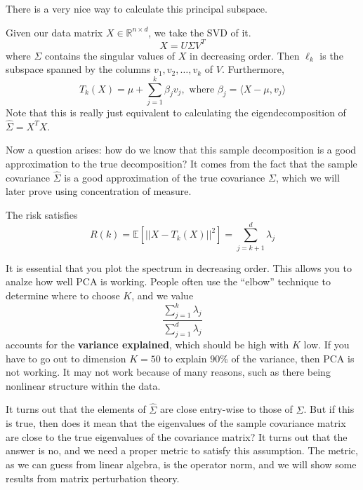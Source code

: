     There is a very nice way to calculate this principal subspace. 

    \begin{theorem} 
      Given our data matrix $X \in \mathbb{R}^{n \times d}$, we take the SVD of it. 
      \begin{equation}
        X = U \Sigma V^T
      \end{equation}
      where $\Sigma$ contains the singular values of $X$ in decreasing order. Then $\ell_k$ is the subspace spanned by the columns $v_1, v_2, \ldots, v_k$ of $V$. Furthermore, 
      \begin{equation}
        T_k (X) = \mu + \sum_{j=1}^k \beta_j v_j , \text{ where } \beta_j = \langle X - \mu, v_j \rangle
      \end{equation}
      Note that this is really just equivalent to calculating the eigendecomposition of $\hat{\Sigma} = X^T X$. 
    \end{theorem}

    Now a question arises: how do we know that this sample decomposition is a good approximation to the true decomposition? It comes from the fact that the sample covariance $\hat{\Sigma}$ is a good approximation of the true covariance $\Sigma$, which we will later prove using concentration of measure. 

    \begin{theorem}[Risk]
      The risk satisfies 
      \begin{equation}
        R(k) = \mathbb{E}[|| X - T_k (X) ||^2 ] = \sum_{j=k+1}^d \lambda_j 
      \end{equation}
    \end{theorem}

    It is essential that you plot the spectrum in decreasing order. This allows you to analze how well PCA is working. People often use the ``elbow'' technique to determine where to choose $K$, and we value 
    \begin{equation}
      \frac{\sum_{j=1}^k \lambda_j}{\sum_{j=1}^d \lambda_j} 
    \end{equation}
    accounts for the \textbf{variance explained}, which should be high with $K$ low. If you have to go out to dimension $K=50$ to explain $90\%$ of the variance, then PCA is not working. It may not work because of many reasons, such as there being nonlinear structure within the data. 

    It turns out that the elements of $\hat{\Sigma}$ are close entry-wise to those of $\Sigma$. But if this is true, then does it mean that the eigenvalues of the sample covariance matrix are close to the true eigenvalues of the covariance matrix? It turns out that the answer is no, and we need a proper metric to satisfy this assumption. The metric, as we can guess from linear algebra, is the operator norm, and we will show some results from matrix perturbation theory. 

